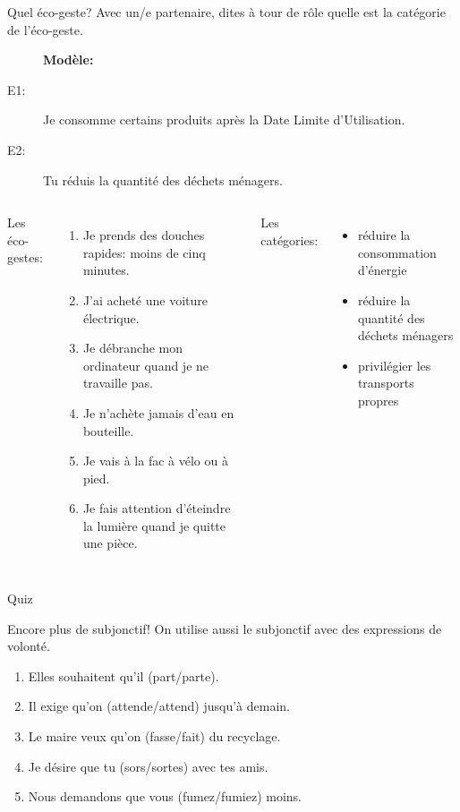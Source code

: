 \documentclass{beamer}
\begin{document}
  \begin{frame}{Quel éco-geste?}
    \scriptsize
    Avec un/e partenaire, dites à tour de rôle  quelle est la catégorie de l'éco-geste.
    \begin{description}
      \item[] \textbf{Modèle:}
      \item[E1:] Je consomme certains produits après la Date Limite d'Utilisation.
      \item[E2:] \alert{Tu réduis} la quantité des déchets ménagers.
    \end{description}
    \begin{columns}[t]
        Les éco-gestes:
        \begin{enumerate}
          \item Je prends des douches rapides: moins de cinq minutes.
          \item J'ai acheté une voiture électrique.
          \item Je débranche mon ordinateur quand je ne travaille pas.
          \item Je n'achète jamais d'eau en bouteille.
          \item Je vais à la fac à vélo ou à pied.
          \item Je fais attention d'éteindre la lumière quand je quitte une pièce.
        \end{enumerate}
        Les catégories:
        \begin{itemize}
          \item réduire la consommation d'énergie
          \item réduire la quantité des déchets ménagers
          \item privilégier les transports propres
        \end{itemize}
    \end{columns}
  \end{frame}

  \begin{frame}{}
    \begin{center}
      \Large Quiz
    \end{center}
  \end{frame}

  \begin{frame}{Encore plus de subjonctif!}
    On utilise aussi le subjonctif avec des expressions de volonté.
    \begin{enumerate}
      \item Elles souhaitent qu'il (part/\alert<2->{parte}).
      \item Il exige qu'on (\alert<3->{attende}/attend) jusqu'à demain.
      \item Le maire veux qu'on (\alert<4->{fasse}/fait) du recyclage.
      \item Je désire que tu (sors/\alert<5->{sortes}) avec tes amis.
      \item Nous demandons que vous (fumez/\alert<6->{fumiez}) moins.
    \end{enumerate}
  \end{frame}
\end{document}
